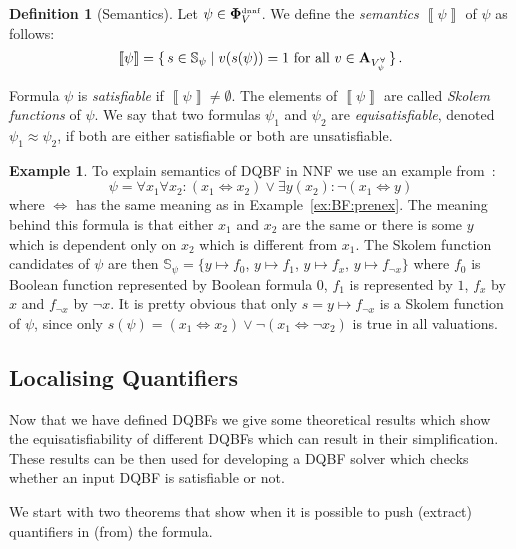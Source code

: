 \documentclass[
  digital, %
  twoside, %
  table,   %
  nolof,     %
  nolot,     %
]{fithesis3}
\let\setbuilder\set
\newcommand{\simpleset}[1]{\{{#1}\}}
\renewcommand{\set}[1]{\normalexpandarg\IfSubStr{#1}{|}{\setbuilder{#1}}{\simpleset{#1}}}
\theoremstyle{definition}
\newtheorem{definition}{Definition}
\newtheorem{example}{Example}
\theoremstyle{remark}
\newcommand{\seman}[1]{\left\llbracket {#1} \right\rrbracket}
\newcommand{\DQBF}[1]{\mathbf{\Phi}_{#1}^{\text{\tiny dnnf}}}
\newcommand{\valtns}[1]{\mathbf{A}_{#1}}
\newcommand{\uvars}[1]{V_{#1}^{\forall}}
\newcommand{\Scands}[1]{\mathbb{S}_{#1}}
\newcommand{\lequal}{\Leftrightarrow}
\begin{document}
\begin{definition}[Semantics]
  Let $\psi \in \DQBF{V}$. We define the \emph{semantics} $\seman{\psi}$ of $\psi$ as follows:
  \[\seman{\psi} = \set{s \in \Scands{\psi} | v(s(\psi))=1 \text{ for all } v \in \valtns{\uvars{\psi}}}.\]
\end{definition}
Formula $\psi$ is \emph{satisfiable} if $\seman{\psi} \not= \emptyset$. The elements of $\seman{\psi}$ are called \emph{Skolem functions} of $\psi$. We say that two formulas $\psi_1$ and $\psi_2$ are \emph{equisatisfiable}, denoted $\psi_1 \approx \psi_2$, if both are either satisfiable or both are unsatisfiable.
\begin{example}
\label{ex:DQBF:NNF}
To explain semantics of DQBF in NNF we use an example from~\cite{HQSquantifierLocalization}:
\[\psi = \forall x_1 \forall x_2 : (x_1 \lequal x_2) \lor \exists y (x_2) : \neg(x_1 \lequal y)\]
where ${\lequal}$ has the same meaning as in Example~\ref{ex:BF:prenex}. The meaning behind this formula is that either $x_1$ and $x_2$ are the same or there is some $y$ which is dependent only on $x_2$ which is different from $x_1$. The Skolem function candidates of $\psi$ are then $\Scands{\psi} = \{y\mapsto f_0$, $y\mapsto f_1$, $y\mapsto f_x$, $y\mapsto f_{\neg x}\}$ %
where $f_0$ is Boolean function represented by Boolean formula $0$, $f_1$ is represented by $1$, $f_x$ by $x$ and $f_{\neg x}$ by $\neg x$. It is pretty obvious that only $s = y \mapsto f_{\neg x}$ is a Skolem function of $\psi$, since only $s(\psi) = (x_1 \lequal x_2) \lor \neg(x_1 \lequal \neg x_2)$ is true in all valuations.
\end{example}

\subsection{Localising Quantifiers}
Now that we have defined DQBFs we give some theoretical results which show the equisatisfiability of different DQBFs which can result in their simplification. These results can be then used for developing a DQBF solver which checks whether an input DQBF is satisfiable or not.

We start with two theorems that show when it is possible to push (extract) quantifiers in (from) the formula. %
\end{document}
